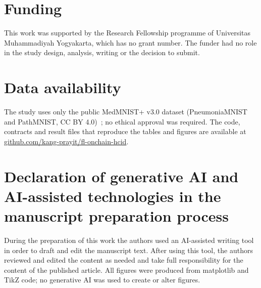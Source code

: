 \documentclass[final,3p,times,twocolumn]{elsarticle}
\begin{document}
\section*{Funding}
This work was supported by the Research Fellowship programme of Universitas Muhammadiyah Yogyakarta, which has no grant number. The funder had no role in the study design, analysis, writing or the decision to submit.

\section*{Data availability}
The study uses only the public MedMNIST+ v3.0 dataset (PneumoniaMNIST and PathMNIST, CC BY 4.0)~\cite{medmnistplus}; no ethical approval was required. The code, contracts and result files that reproduce the tables and figures are available at \href{https://github.com/kang-prayit/fl-onchain-hcid}{github.com/\mbox{kang-prayit}/\mbox{fl-onchain-hcid}}.

\section*{Declaration of generative AI and AI-assisted technologies in the manuscript preparation process}
During the preparation of this work the authors used an AI-assisted writing tool in order to draft and edit the manuscript text. After using this tool, the authors reviewed and edited the content as needed and take full responsibility for the content of the published article. All figures were produced from matplotlib and TikZ code; no generative AI was used to create or alter figures.

\setlength{\bibsep}{0pt plus 0.3pt}
\renewcommand{\bibfont}{\footnotesize}

\end{document}
